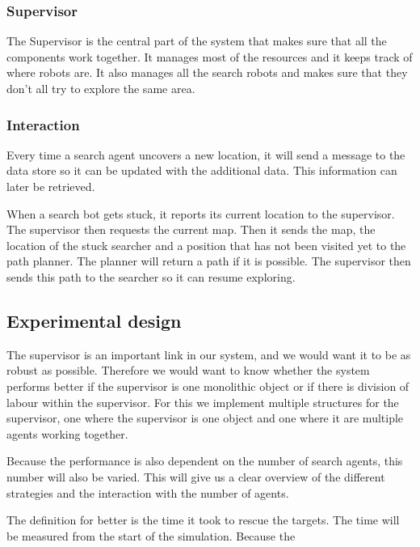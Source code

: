 \subsubsection{Supervisor}
The Supervisor is the central part of the system that makes sure that all
the components work together. It manages most of the resources and it keeps
track of where robots are. It also manages all the search robots and makes sure
that they don't all try to explore the same area.

\subsubsection{Interaction}
Every time a search agent uncovers a new location, it will send a message to
the data store so it can be updated with the additional data. This information
can later be retrieved.

When a search bot gets stuck, it reports its current location to the
supervisor. The supervisor then requests the current map. Then it sends the
map, the location of the stuck searcher and a position that has not been
visited yet to the path planner. The planner will return a path if it is
possible. The supervisor then sends this path to the searcher so it can
resume exploring.

\subsection{Experimental design}
The supervisor is an important link in our system, and we would want it to
be as robust as possible. Therefore we would want to know whether the
system performs better if the supervisor is one monolithic object or if
there is division of labour within the supervisor. For this we implement
multiple structures for the supervisor, one where the supervisor is one
object and one where it are multiple agents working together. 

Because the performance is also dependent on the number of search agents, this
number will also be varied. This will give us a clear overview of the
different strategies and the interaction with the number of agents.

The definition for better is the time it took to rescue the targets.  The
time will be measured from the start of the simulation. Because the 
